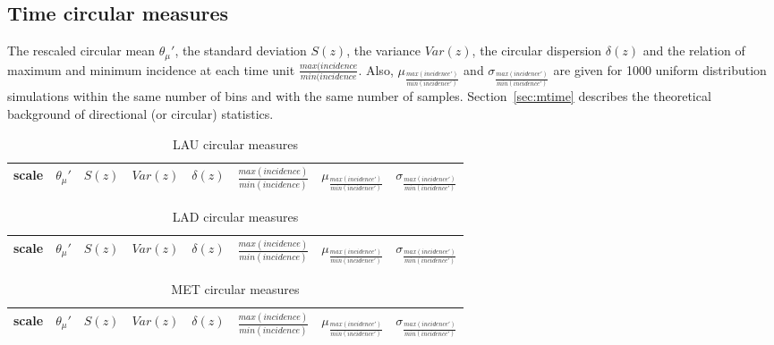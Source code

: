 \documentclass[%
 aip,
 jmp,%
 amsmath,amssymb,
 reprint,%
 floatfix,
]{revtex4-1}
\begin{document}
\subsection{Time circular measures}
The rescaled circular mean $\theta_\mu'$, the standard deviation $S(z)$, the variance $Var(z)$, the circular dispersion $\delta(z)$ and the relation of maximum and minimum incidence at each time unit $\frac{max(incidence}{min(incidence}$. Also, $ \mu_{\frac{max(incidence')}{min(incidence')}} $ and $ \sigma_{\frac{max(incidence')}{min(incidence')} }$ are given for 1000 uniform distribution simulations within the same number of bins and with the same number of samples. Section~\ref{sec:mtime} describes the theoretical background of directional (or circular) statistics.
\begin{table}[!h]
	\caption{LAU circular measures}
\begin{center}
    \begin{tabular}{ |l|| c|c|c|c|c||c|c| }
        \hline
scale & $\theta_\mu'$ & $S(z)$ & $Var(z)$ & $\delta(z)$ & $\frac{max(incidence)}{min(incidence)}$ & $ \mu_{\frac{max(incidence')}{min(incidence')}} $ & $ \sigma_{\frac{max(incidence')}{min(incidence')} } $ \\ \hline\hline
	
    \end{tabular}
\end{center}
\label{tab:circ}
\end{table}
\begin{table}[!h]
	\caption{LAD circular measures}
\begin{center}
    \begin{tabular}{ |l|| c|c|c|c|c||c|c| }
        \hline
scale & $\theta_\mu'$ & $S(z)$ & $Var(z)$ & $\delta(z)$ & $\frac{max(incidence)}{min(incidence)}$ & $ \mu_{\frac{max(incidence')}{min(incidence')}} $ & $ \sigma_{\frac{max(incidence')}{min(incidence')} } $ \\ \hline\hline
	
    \end{tabular}
\end{center}
\label{tab:circ}
\end{table}
\begin{table}[!h]
	\caption{MET circular measures}
\begin{center}
    \begin{tabular}{ |l|| c|c|c|c|c||c|c| }
        \hline
scale & $\theta_\mu'$ & $S(z)$ & $Var(z)$ & $\delta(z)$ & $\frac{max(incidence)}{min(incidence)}$ & $ \mu_{\frac{max(incidence')}{min(incidence')}} $ & $ \sigma_{\frac{max(incidence')}{min(incidence')} } $ \\ \hline\hline
	
    \end{tabular}
\end{center}
\label{tab:circ}
\end{table}
\end{document}
